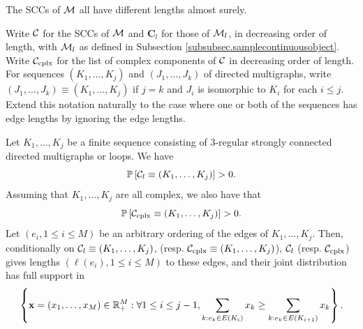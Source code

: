 \begin{proposition}
\label{prop:allengthsaredifferent}
The SCCs of ${\mathcal M}$ all have different lengths almost surely.
\end{proposition}
Write ${\mathcal C}$ for the SCCs of ${\mathcal M}$ and $\mathbf{C}_l$ for those of ${\mathcal M}_l$, in decreasing order of length, with ${\mathcal M}_l$ as defined in Subsection  \ref{subsubsec.samplecontinuousobject}. Write ${\mathcal C}_{\text{cplx}}$ for the list of complex components of ${\mathcal C}$ in decreasing order of length. For sequences $(K_1,\dots, K_j)$ and $(J_1,\dots,J_k)$ of directed multigraphs, write $(J_1,\dots,J_k)\equiv(K_1,\dots, K_j)$ if $j=k$ and $J_i$ is isomorphic to $K_i$ for each $i\leq j$. Extend this notation naturally to the case where one or both of the sequences has edge lengths by ignoring the edge lengths. 
\begin{theorem}
Let $K_1,\dots, K_j$ be a finite sequence consisting of $3$-regular strongly connected directed multigraphs or loops. We have 
$${\mathbb P}\left[{\mathcal C}_l\equiv(K_1,\dots, K_j)\right]>0.$$
Assuming that $K_1,\dots, K_j$ are all complex, we also have that 
$${\mathbb P}\left[ {\mathcal C}_{\text{cplx}}\equiv(K_1,\dots, K_j)\right]>0.$$
Let $(e_i,1\leq i \leq M)$ be an arbitrary ordering of the edges of $K_1,\dots, K_j$. Then, conditionally on ${\mathcal C}_l\equiv(K_1,\dots, K_j)$, (resp. ${\mathcal C}_{\text{cplx}}\equiv(K_1,\dots, K_j)$), ${\mathcal C}_l$ (resp. ${\mathcal C}_{\text{cplx}}$) gives lengths $(\ell(e_i),1\leq i \leq M)$ to these edges, and their joint distribution has full support in 
$$\left\{\mathbf{x}=(x_1,\dots, x_M)\in {\mathbb R}_+^M:\forall 1\leq i\leq j-1, \sum_{k:e_k\in E(K_i)}x_k \geq \sum_{k:e_k\in E(K_{i+1})}x_k\right\}.$$
\end{theorem}



